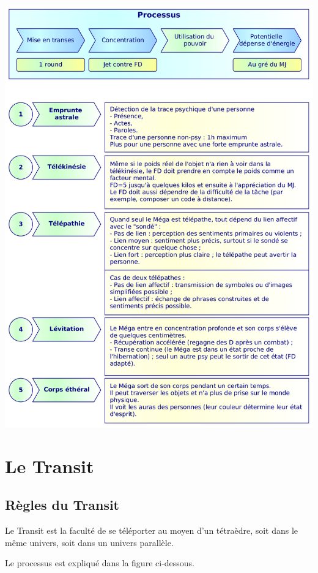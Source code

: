 \documentclass[11pt]{article}
\begin{document}
\begin{center}
\includegraphics[scale=0.28]{03-pouvoirs-psy}
\end{center}

\newpage
\section{Le Transit}

\subsection{Règles du Transit}

Le Transit est la faculté de se téléporter au moyen d'un tétraèdre, soit dans le même univers, soit dans un univers parallèle.

Le processus est expliqué dans la figure ci-dessous.
\end{document}
